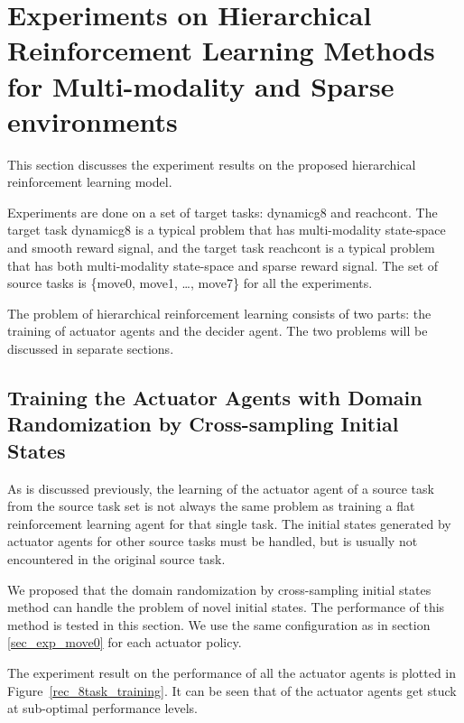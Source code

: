
\section{Experiments on Hierarchical Reinforcement Learning Methods for Multi-modality and Sparse environments}
This section discusses the experiment results on the proposed hierarchical reinforcement learning model.

Experiments are done on a set of target tasks: dynamicg8 and reachcont. The target task dynamicg8 is a typical problem that has multi-modality state-space and smooth reward signal, and the target task reachcont is a typical problem that has both multi-modality state-space and sparse reward signal. The set of source tasks is  \{move0, move1, \dots, move7\} for all the experiments.

The problem of hierarchical reinforcement learning consists of two parts: the training of actuator agents and the decider agent. The two problems will be discussed in separate sections.


\subsection{Training the Actuator Agents with Domain Randomization by Cross-sampling Initial States}
As is discussed previously, the learning of the actuator agent of a source task from the source task set is not always the same problem as training a flat reinforcement learning agent for that single task. The initial states generated by actuator agents for other source tasks must be handled, but is usually not encountered in the original source task.

We proposed that the domain randomization by cross-sampling initial states method can handle the problem of novel initial states. The performance of this method is tested in this section. We use the same configuration as in section \ref{sec_exp_move0} for each actuator policy.  

The experiment result on the performance of all the actuator agents is plotted in Figure~\ref{rec_8task_training}. It can be seen that of the actuator agents get stuck at sub-optimal performance levels. 

